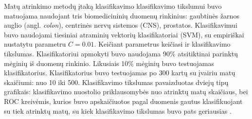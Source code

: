 Matų atrinkimo metodų įtaką klasifikavimo klasifikavimo tikslumui buvo matuojama naudojant tris biomedicininių duomenų rinkinius: gaubtinės žarnos auglio (angl. \textit{colon}), centrinės nervų sistemos (CNS), prostatos. Klasifikavimui buvo naudojami tiesiniai atraminių vektorių klasifikatoriai (SVM), su empiriškai nustatytu parametru $C=0.01$. Keičiant parametrus keičiasi ir klasifikavimo tikslumas.
Klasifikatoriui apmokyti buvo naudojama 90\% atsitiktinai parinktų mėginių iš duomenų rinkinio. Likusiais 10\% mėginių buvo testuojamas klasifikatorius. Klasifikatorius buvo testuojamas po 300 kartų su įvairiu matų skaičiumi: nuo 10 iki 500. Klasifikavimo tikslumas pavaizduotas dviejų tipų grafikais: klasifikavimo nuostolio priklausomybės nuo atrinktų matų skaičiaus, bei ROC kreivėmis, kurios buvo apskaičiuotos pagal duomenis gautus klasifikuojant su tiek atrinktų matų, su kiek klasifikavimo tikslumas buvo pats geriausias \cite{green1966signal}.
